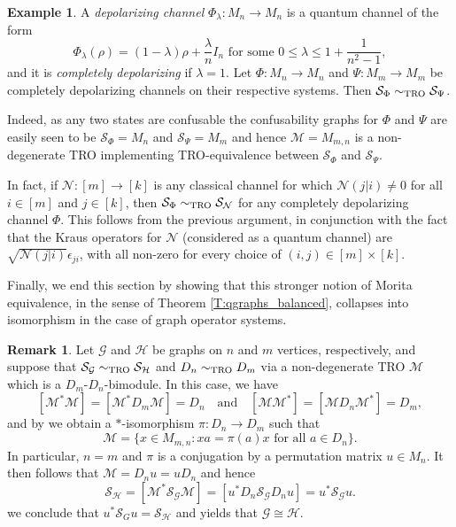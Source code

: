 \documentclass[11pt]{amsart}
\numberwithin{equation}{section}
\theoremstyle{plain}
\theoremstyle{definition}
\newtheorem{example}[theorem]{Example}
\newtheorem{remark}[theorem]{Remark}
\theoremstyle{remark}
\newcommand{\G}{{\mathcal{G}}}
\renewcommand{\H}{{\mathcal{H}}}
\newcommand{\M}{{\mathcal{M}}}
\newcommand{\N}{{\mathcal{N}}}
\renewcommand{\S}{{\mathcal{S}}}
\newcommand{\foral}{\text{ for all }}
\newcommand{\qand}{\quad\text{and}\quad}
\begin{document}
\begin{example}
\rm A \textit{depolarizing channel} $\Phi_{\lambda}: M_{n}\rightarrow M_{n}$ is a quantum channel of the form 
\[
\Phi_{\lambda}(\rho) = (1-\lambda)\rho+\frac{\lambda}{n}I_{n} \text{ for some } 0 \leq \lambda \leq 1+\frac{1}{n^{2}-1},
\]
and it is \textit{completely depolarizing} if $\lambda = 1$. Let $\Phi\colon M_{n}\rightarrow M_{n}$ and $\Psi\colon M_{m}\rightarrow M_{m}$ be completely depolarizing channels on their respective systems.
Then $\S_{\Phi}\sim_{\rm TRO} \S_{\Psi}$.

Indeed, as any two states are confusable the confusability graphs for $\Phi$ and $\Psi$ are easily seen to be $\S_{\Phi} = M_{n}$ and $\S_{\Psi} = M_{m}$ and hence $\M = M_{m, n}$ is a non-degenerate TRO implementing TRO-equivalence between $\S_{\Phi}$ and $\S_{\Psi}$. 

In fact, if $\N: [m]\rightarrow [k]$ is any classical channel for which $\N(j|i) \neq 0$ for all $i \in [m]$ and $j \in [k]$, then $\S_{\Phi} \sim_{\rm TRO}\S_{\N}$ for any completely depolarizing channel $\Phi$. This follows from the previous argument, in conjunction with the fact that the Kraus operators for $\N$ (considered as a quantum channel) are $\sqrt{\N(j|i)}\epsilon_{ji}$, with all non-zero for every choice of $(i, j) \in [m]\times [k]$. 
\end{example}

Finally, we end this section by showing that this stronger notion of Morita equivalence, in the sense of Theorem \ref{T:qgraphs_balanced}, collapses into isomorphism in the case of graph operator systems.

\begin{remark}\label{R:graphstrtro}
Let $\G$ and $\H$ be graphs on $n$ and $m$ vertices, respectively, and suppose that $\S_\G\sim_{\rm TRO}\S_\H$ and $D_n\sim_{\rm TRO}D_m$ via a non-degenerate TRO $\M$ which is a $D_m$-$D_n$-bimodule. In this case, we have
\[
[\M^* \M]=[\M^* D_m \M]=D_n \qand [\M\M^*]=[\M D_n \M^*]=D_m,
\]
and by \cite[Theorem 3.2]{Ele12} we obtain a $*$-isomorphism $\pi \colon D_n \to D_m$ such that
\[
\M=\{x\in M_{m,n}: xa=\pi(a)x \foral a\in D_n\}.
\]
In particular, $n=m$ and $\pi$ is a conjugation by a permutation matrix $u\in M_n$. It then follows that $\M=D_n u=uD_n$ and hence
\[
\S_\H=[\M^* \S_\G \M]= [u^* D_n \S_\G D_n u]= u^* \S_\G u.
\]
we conclude that $u^*\S_G u=\S_\H$ and \cite[Proposition 3.1]{OP14} yields that $\G\cong \H$.
\end{remark}

\end{document}

